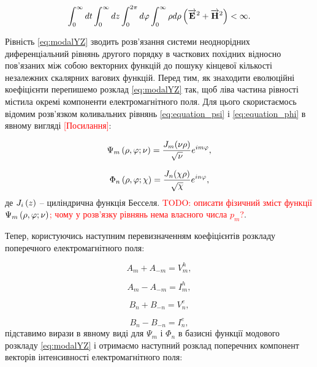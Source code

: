 \begin{equation} \label{eq:energy_restrict}
\int_0^\infty dt \int_0^\infty dz 
\int_0^{2\pi} d\varphi \int_0^\infty \rho d \rho
\left(  \overrightarrow{\mathbf E}^2 + \overrightarrow{\mathbf H}^2 \right) < \infty.
\end{equation}

Рівність \eqref{eq:modalYZ} зводить розв'язання системи неоднорідних 
диференціальний рівнянь другого порядку в часткових похідних  
відносно пов'язаних між собою векторних функцій до пошуку кінцевої кількості 
незалежних скалярних вагових функцій. Перед тим, як знаходити еволюційні 
коефіцієнти перепишемо розклад \eqref{eq:modalYZ} так, щоб ліва 
частина рівності містила окремі компоненти електромагнітного поля. Для цього 
скористаємось відомим розв'язком коливальних рівнянь \eqref{eq:equation_psi} 
і \eqref{eq:equation_phi} в явному вигляді \textcolor{red}{[Посилання]}:

\begin{equation}
\Psi_m \left( \rho, \varphi; \nu \right) = 
\frac{J_m (\nu \rho)}{\sqrt{\nu}} e^{im\varphi},
\end{equation}

\begin{equation}
\Phi_n \left( \rho, \varphi; \chi \right) = 
\frac{J_n (\chi \rho)}{\sqrt{\chi}} e^{in\varphi},
\end{equation}
%
де $ J_i \left( z \right) $ -- циліндрична функція Бесселя. \textcolor{red}{TODO: 
описати фізичний зміст функції $ \Psi_m \left( \rho, \varphi; \nu \right) $; чому у 
розв'язку рівнянь нема власного числа $ p_m $?}.

Тепер, користуючись наступним перевизначенням коефіцієнтів розкладу 
поперечного електромагнітного поля:

\begin{equation}
A_m + A_{-m} = V_m^h,
\end{equation}

\begin{equation}
A_m - A_{-m} = I_m^h,
\end{equation}

\begin{equation}
B_n + B_{-n} = V_n^e,
\end{equation}

\begin{equation}
B_n - B_{-n} = I_n^e,
\end{equation}
%
підставимо вирази в явному виді для $ \Psi_m $ і $ \Phi_n $ в базисні функції 
модового розкладу \eqref{eq:modalYZ} і отримаємо наступний розклад поперечних 
компонент векторів інтенсивності електромагнітного поля:

